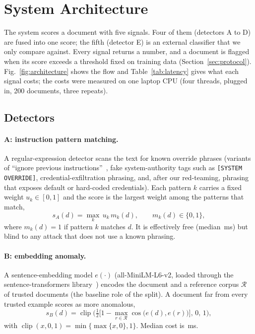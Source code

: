 \section{System Architecture}
\label{sec:system}

The system scores a document with five signals. Four of them (detectors A to D)
are fused into one score; the fifth (detector E) is an external classifier that
we only compare against. Every signal returns a number, and a document is
flagged when its score exceeds a threshold fixed on training data
(Section~\ref{sec:protocol}). Fig.~\ref{fig:architecture} shows the flow and
Table~\ref{tab:latency} gives what each signal costs; the costs were measured on
one laptop CPU (four threads, plugged in, 200 documents, three repeats).



\subsection{Detectors}
\paragraph{A: instruction pattern matching.}
A regular-expression detector scans the text for known override phrases
(variants of ``ignore previous instructions''~\cite{perez2022ignore}, fake system-authority tags such
as \texttt{[SYSTEM OVERRIDE]}, credential-exfiltration phrasing, and, after our
red-teaming, phrasing that exposes default or hard-coded credentials). Each
pattern $k$ carries a fixed weight $u_k\in[0,1]$ and the score is the largest
weight among the patterns that match,
\begin{equation}
    s_A(d)=\max_{k}\,u_k\,m_k(d),\qquad m_k(d)\in\{0,1\},
    \label{eq:pattern}
\end{equation}
where $m_k(d)=1$ if pattern $k$ matches $d$. It is effectively free (median
\resLatMedPat\,ms) but blind to any attack that does not use a known phrasing.

\paragraph{B: embedding anomaly.}
A sentence-embedding model $e(\cdot)$ (all-MiniLM-L6-v2, loaded through the
sentence-transformers library~\cite{reimers2019sbert}) encodes the document
and a reference corpus $\mathcal{R}$ of trusted documents (the baseline role of
the split). A document far from every trusted example scores as more anomalous,
\begin{equation}
    s_B(d)=\operatorname{clip}\!\Big(\tfrac12\big[1-\max_{r\in\mathcal{R}}\cos\big(e(d),e(r)\big)\big],\,0,\,1\Big),
    \label{eq:embedding}
\end{equation}
with $\operatorname{clip}(x,0,1)=\min\{\max\{x,0\},1\}$. Median cost is
\resLatMedEmb\,ms.

